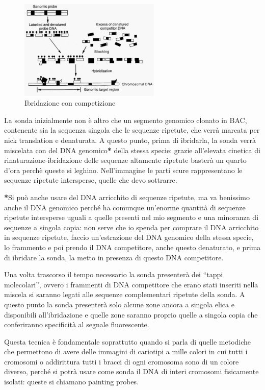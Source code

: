 \documentclass[11pt]{book}
\begin{document}
\begin{figure}
    \includegraphics[width=0.6\textwidth]{img/38_competizione.png}
  \caption{Ibridazione con competizione}
\end{figure}

La sonda inizialmente non è altro che un segmento genomico clonato in BAC, contenente sia la sequenza singola che le sequenze ripetute, che verrà marcata per nick translation e denaturata. A questo punto, prima di ibridarla, la sonda verrà miscelata con del DNA genomico\textbf{*} della stessa specie: grazie all'elevata cinetica di rinaturazione-ibridazione delle sequenze altamente ripetute basterà un quarto d'ora perchè queste si leghino.
Nell'immagine le parti scure rappresentano le sequenze ripetute intersperse, quelle che devo sottrarre.

\textbf{*}Si può anche usare del DNA arricchito di sequenze ripetute, ma va benissimo anche il DNA genomico perché ha comunque un’enorme quantità di sequenze ripetute intersperse uguali a quelle presenti nel mio segmento e una minoranza di sequenze a singola copia: non serve che io spenda per comprare il DNA arricchito in sequenze ripetute, faccio un’estrazione del DNA genomico della stessa specie, lo frammento e poi prendo il DNA competitore, anche questo denaturato, e prima di ibridare la sonda, la metto in presenza di questo DNA competitore.

Una volta trascorso il tempo necessario la sonda presenterà dei ``tappi molecolari'', ovvero i frammenti di DNA competitore che erano stati inseriti nella miscela si saranno legati alle sequenze complementari ripetute della sonda. A questo punto la sonda presenterà solo alcune zone ancora a singola elica e disponibili all'ibridazione e quelle zone saranno proprio quelle a singola copia che conferiranno specificità al segnale fluorescente.

Questa tecnica è fondamentale soprattutto quando si parla di quelle metodiche che permettono di avere delle immagini di cariotipi a mille colori in cui tutti i cromosomi o addirittura tutti i bracci di ogni cromosoma sono di un colore diverso, perché si potrà usare come sonda il DNA di interi cromosomi fisicamente isolati: queste si chiamano painting probes. 
\end{document}
